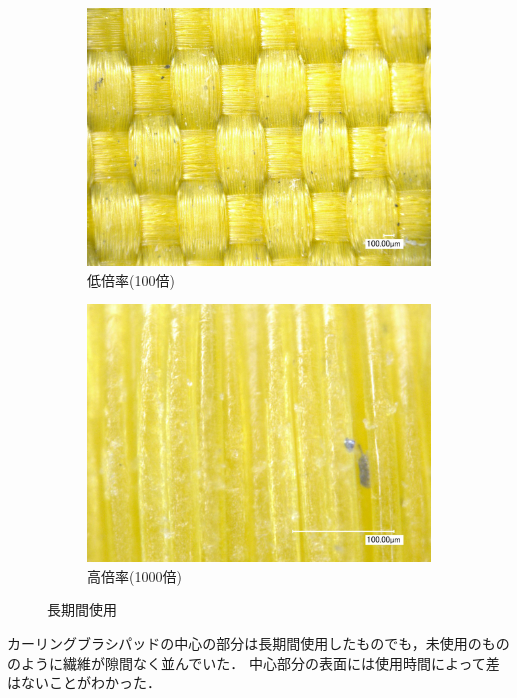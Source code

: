 \documentclass[main]{subfiles}
\begin{document}
\begin{figure}[H]
    \centering
    \begin{subfigure}[htbp]{0.45\linewidth}
        \centering
        \includegraphics[keepaspectratio, width=0.8\linewidth]{figures/中心/カーリングパッド長期低倍率.jpg}
        \caption{低倍率(100倍)}
        \label{fig:label}
    \end{subfigure}
    \begin{subfigure}[htbp]{0.45\linewidth}
        \centering
        \includegraphics[keepaspectratio, width=0.8\linewidth]{figures/中心/カーリングパッド長期.jpg}
        \caption{高倍率(1000倍)}
        \label{fig:label}
    \end{subfigure}
    \caption{長期間使用}
    \label{fig:7}
\end{figure}


カーリングブラシパッドの中心の部分は長期間使用したものでも，未使用のもののように繊維が隙間なく並んでいた．
中心部分の表面には使用時間によって差はないことがわかった．
\end{document}
